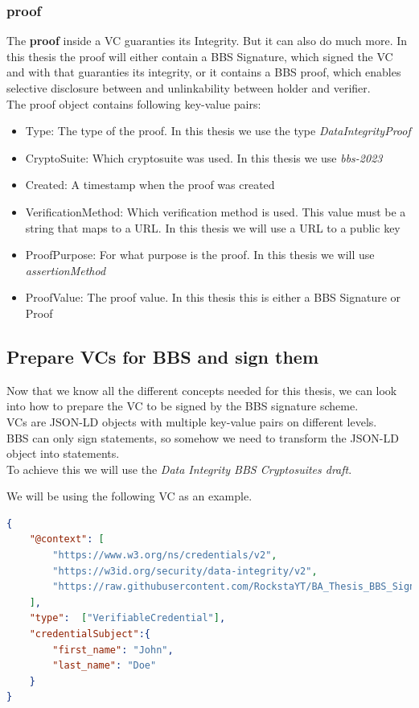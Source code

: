 \documentclass[
	a4paper               %
	,bibliography=totoc   %
	,listof=totoc         %
	,monolingual
	twoside=false,
]{bfhthesis}              %
\begin{document}
\subsubsection{proof}
The \textbf{proof} inside a VC guaranties its Integrity. But it can also do much more.
In this thesis the proof will either contain a BBS Signature, which signed the VC and with that guaranties its integrity, or it contains a BBS proof, which enables selective disclosure between and unlinkability between holder and verifier.\\
The proof object contains following key-value pairs:
\begin{itemize}
	\item Type: The type of the proof. In this thesis we use the type \textit{DataIntegrityProof}
	\item CryptoSuite: Which cryptosuite was used. In this thesis we use \textit{bbs-2023}
	\item Created: A timestamp when the proof was created
	\item VerificationMethod: Which verification method is used. This value must be a string that maps to a URL. In this thesis we will use a URL to a public key
	\item ProofPurpose: For what purpose is the proof. In this thesis we will use \textit{assertionMethod}
	\item ProofValue: The proof value. In this thesis this is either a BBS Signature or Proof
\end{itemize}

\subsection{Prepare VCs for BBS and sign them}
\label{sub:preparevc}
Now that we know all the different concepts needed for this thesis, we can look into how to prepare the VC to be signed by the BBS signature scheme.\\
VCs are JSON-LD objects with multiple key-value pairs on different levels.\\
BBS can only sign statements, so somehow we need to transform the JSON-LD object into statements.\\
To achieve this we will use the \textit{Data Integrity BBS Cryptosuites draft}\cite{bbsvc}.\newpage

We will be using the following VC as an example.
\begin{lstlisting}[language=json,firstnumber=1,caption={Example VC},captionpos=b]
{
	"@context": [
		"https://www.w3.org/ns/credentials/v2",
		"https://w3id.org/security/data-integrity/v2",
		"https://raw.githubusercontent.com/RockstaYT/BA_Thesis_BBS_Signatures/docs/context/example_1.jsonld"
	],
	"type":  ["VerifiableCredential"],
	"credentialSubject":{
		"first_name": "John",
		"last_name": "Doe"
	}
}
\end{lstlisting}
\end{document}
